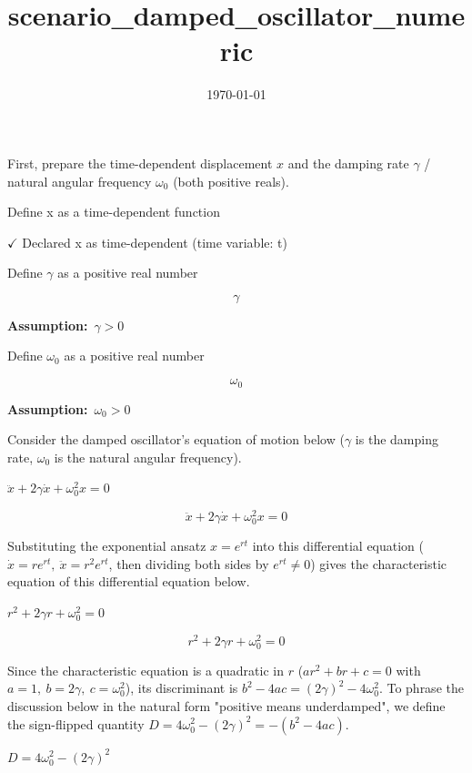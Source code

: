\documentclass[dvipdfmx]{article}
\title{scenario\_damped\_oscillator\_numeric}
\date{\today}
\begin{document}
\maketitle

First, prepare the time-dependent displacement $x$ and the damping rate $\gamma$ / natural angular frequency $\omega_0$ (both positive reals).

Define x as a time-dependent function

$\checkmark$ Declared x as time-dependent (time variable: t)

Define $\gamma$ as a positive real number

\[
  \gamma
\]

\noindent\textbf{Assumption:}\ $\displaystyle \gamma > 0$\par

Define $\omega_0$ as a positive real number

\[
  \omega_{0}
\]

\noindent\textbf{Assumption:}\ $\displaystyle \omega_{0} > 0$\par

Consider the damped oscillator's equation of motion below ($\gamma$ is the damping rate, $\omega_0$ is the natural angular frequency).

$\ddot{x} + 2 \gamma \dot{x} + \omega_0^2 x = 0$

\begin{equation}
  \ddot{x} + 2 \gamma \dot{x} + \omega_0^2 x = 0
  \label{eq:E1}
\end{equation}

Substituting the exponential ansatz $x=e^{rt}$ into this differential equation ($\dot x=re^{rt},\ \ddot x=r^2e^{rt}$, then dividing both sides by $e^{rt}\neq0$) gives the characteristic equation of this differential equation below.

$r^2 + 2 \gamma r + \omega_0^2 = 0$

\begin{equation}
  r^2 + 2 \gamma r + \omega_0^2 = 0
  \label{eq:E2}
\end{equation}

Since the characteristic equation is a quadratic in $r$ ($ar^2+br+c=0$ with $a=1,\ b=2\gamma,\ c=\omega_0^2$), its discriminant is $b^2-4ac=(2\gamma)^2-4\omega_0^2$. To phrase the discussion below in the natural form "positive means underdamped", we define the sign-flipped quantity $D=4\omega_0^2-(2\gamma)^2=-(b^2-4ac)$.

$D = 4 \omega_0^2 - (2 \gamma)^2$
\end{document}
